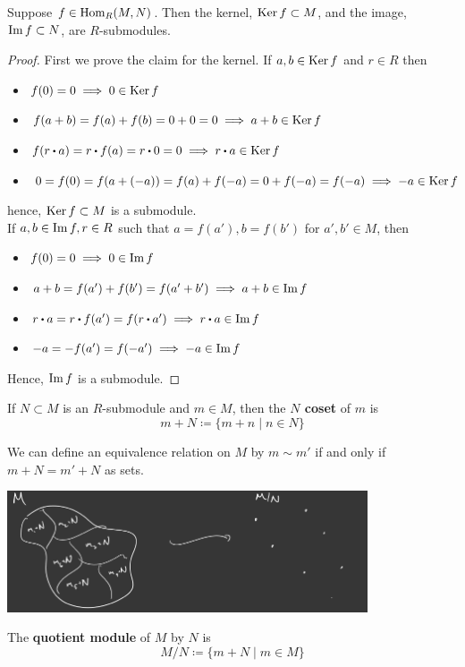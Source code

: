 \documentclass[../Main.tex]{subfiles}
\begin{document}
\begin{prop}[title = Kernel and Image are submodules]
	Suppose $f\in \operatorname{Hom}_R(M,N)$. Then the kernel, $\operatorname{Ker} f \subset M$, and the image, $\operatorname{Im} f \subset N$,	 are $R$-submodules.
\end{prop}
\begin{proof}
	First we prove the claim for the kernel. If $a,b \in \operatorname{Ker} f$ and $r\in R$ then
	\begin{itemize}
	\item $f(0)=0\implies 0 \in \operatorname{Ker} f$
	\item $f(a+b) = f(a)+f(b) = 0 +0=0 \implies a+b \in \operatorname{Ker} f$
	\item$f(r\rdot a) = r\rdot f(a) = r\rdot 0=0 \implies r\rdot a \in \Ker f$
	\item$0=f(0)=f(a+(-a)) = f(a) + f(-a) = 0 +f(-a) = f(-a) \implies -a\in \operatorname{Ker} f$
	\end{itemize}
	hence, $\operatorname{Ker} f \subset M$ is a submodule.\\
	If $a,b\in \operatorname{Im} f, r\in R$ such that $a=f(a'), b=f(b')$ for $ a',b' \in M$, then
	\begin{itemize}
		\item $f(0)=0\implies 0\in \operatorname{Im} f$
		\item $a+b=f(a')+f(b')=f(a'+b')\implies a+b\in \operatorname{Im} f$
		\item $r\rdot a=r\rdot f(a')=f(r\rdot a') \implies r\rdot a \in \Img f$
		\item $-a=-f(a')=f(-a') \implies -a\in \operatorname{Im} f$
	\end{itemize}
	Hence, $\operatorname{Im} f$ is a submodule.
\end{proof}
\begin{dfn}[title = Coset]
	If $N\subset M$ is an $R$-submodule and $m\in M$, then the \textbf{$N$ coset} of $m$ is
	\[m+N \coloneqq \{m+n\mid n\in N\}\]
\end{dfn}
\Exr We can define an equivalence relation on $M$ by $m\sim m'$ if and only if $m+N = m'+N$ as sets.
\begin{center}
	\includegraphics[width=0.8\textwidth]{coset}
\end{center}
\begin{dfn}[title = Quotient Module]
	The \textbf{quotient module} of $M$ by $N$ is
	\[M/N \coloneqq \{m+N \mid m\in M\}\]
\end{dfn}
\end{document}
